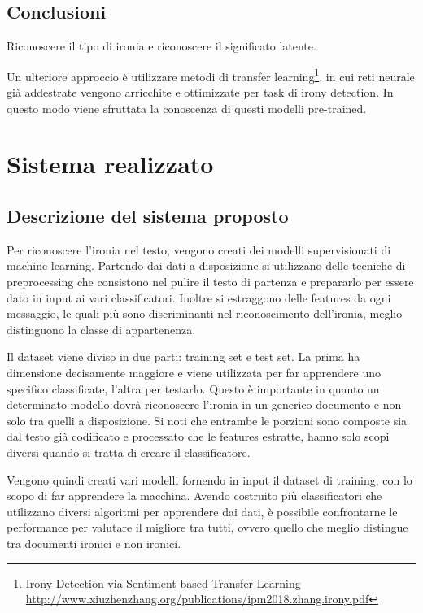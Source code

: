 \documentclass[oneside]{book}
\begin{document}
\section{Conclusioni}




Riconoscere il tipo di ironia e riconoscere il significato latente.

Un ulteriore approccio è utilizzare metodi di transfer learning\footnote{Irony Detection via Sentiment-based Transfer Learning\\ \url{http://www.xiuzhenzhang.org/publications/ipm2018.zhang.irony.pdf}}, in cui reti neurale già addestrate vengono arricchite e ottimizzate per task di irony detection. In questo modo viene sfruttata la conoscenza di questi modelli pre-trained.



\chapter{Sistema realizzato}

\section{Descrizione del sistema proposto}
Per riconoscere l'ironia nel testo, vengono creati dei modelli supervisionati di machine learning.
Partendo dai dati a disposizione si utilizzano delle tecniche di preprocessing che consistono nel pulire il testo di partenza e prepararlo per essere dato in input ai vari classificatori. Inoltre si estraggono delle features da ogni messaggio, le quali più sono discriminanti nel riconoscimento dell'ironia, meglio distinguono la classe di appartenenza.

Il dataset viene diviso in due parti: training set e test set. La prima ha dimensione decisamente maggiore e viene utilizzata per far apprendere uno specifico classificate, l'altra per testarlo. Questo è importante in quanto un determinato modello dovrà riconoscere l'ironia in un generico documento e non solo tra quelli a disposizione. Si noti che entrambe le porzioni sono composte sia dal testo già codificato e processato che le features estratte, hanno solo scopi diversi quando si tratta di creare il classificatore. 

Vengono quindi creati vari modelli fornendo in input il dataset di training, con lo scopo di far apprendere la macchina. Avendo costruito più classificatori che utilizzano diversi algoritmi per apprendere dai dati, è possibile confrontarne le performance per valutare il migliore tra tutti, ovvero quello che meglio distingue tra documenti ironici e non ironici.
\end{document}
